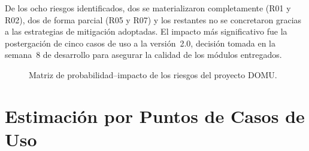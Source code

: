 De los ocho riesgos identificados, dos se materializaron completamente (R01 y R02), dos de forma parcial (R05 y R07) y los restantes no se concretaron gracias a las estrategias de mitigación adoptadas. El impacto más significativo fue la postergación de cinco casos de uso a la versión~2.0, decisión tomada en la semana~8 de desarrollo para asegurar la calidad de los módulos entregados.

%
%
%
%
%
\begin{figure}[H]
  \centering
  \caption{Matriz de probabilidad--impacto de los riesgos del proyecto DOMU.}
  \label{fig:matriz-riesgos}
\end{figure}

\section{Estimación por Puntos de Casos de Uso}


